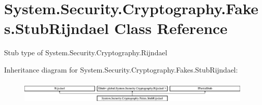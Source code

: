 \hypertarget{class_system_1_1_security_1_1_cryptography_1_1_fakes_1_1_stub_rijndael}{\section{System.\-Security.\-Cryptography.\-Fakes.\-Stub\-Rijndael Class Reference}
\label{class_system_1_1_security_1_1_cryptography_1_1_fakes_1_1_stub_rijndael}
}


Stub type of System.\-Security.\-Cryptography.\-Rijndael 


Inheritance diagram for System.\-Security.\-Cryptography.\-Fakes.\-Stub\-Rijndael\-:\begin{figure}[H]
\begin{center}
\leavevmode
\includegraphics[height=1.124498cm]{class_system_1_1_security_1_1_cryptography_1_1_fakes_1_1_stub_rijndael}
\end{center}
\end{figure}
